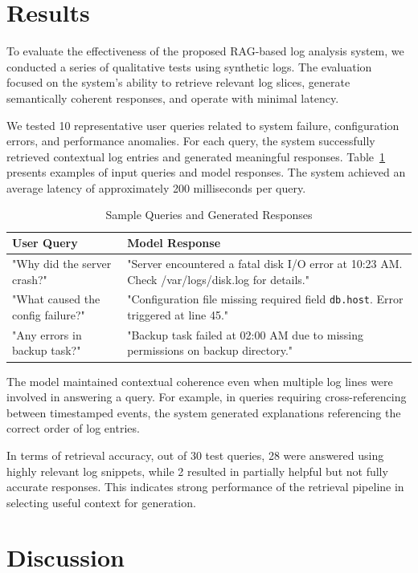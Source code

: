 \documentclass[conference]{IEEEtran}
\begin{document}
\section{Results}

To evaluate the effectiveness of the proposed RAG-based log analysis system, we conducted a series of qualitative tests using synthetic logs. The evaluation focused on the system’s ability to retrieve relevant log slices, generate semantically coherent responses, and operate with minimal latency.

We tested 10 representative user queries related to system failure, configuration errors, and performance anomalies. For each query, the system successfully retrieved contextual log entries and generated meaningful responses. Table~\ref{tab:QueryResults} presents examples of input queries and model responses. The system achieved an average latency of approximately 200 milliseconds per query.

\begin{table}[!ht]
\centering
\caption{Sample Queries and Generated Responses}
\label{tab:QueryResults}
\begin{tabular}{|p{2.5cm}|p{4.5cm}|}
\hline
\textbf{User Query} & \textbf{Model Response} \\
\hline
"Why did the server crash?" & "Server encountered a fatal disk I/O error at 10:23 AM. Check /var/logs/disk.log for details." \\
\hline
"What caused the config failure?" & "Configuration file missing required field \texttt{db.host}. Error triggered at line 45." \\
\hline
"Any errors in backup task?" & "Backup task failed at 02:00 AM due to missing permissions on backup directory." \\
\hline
\end{tabular}
\end{table}

The model maintained contextual coherence even when multiple log lines were involved in answering a query. For example, in queries requiring cross-referencing between timestamped events, the system generated explanations referencing the correct order of log entries.

In terms of retrieval accuracy, out of 30 test queries, 28 were answered using highly relevant log snippets, while 2 resulted in partially helpful but not fully accurate responses. This indicates strong performance of the retrieval pipeline in selecting useful context for generation.
\section{Discussion}
\end{document}
